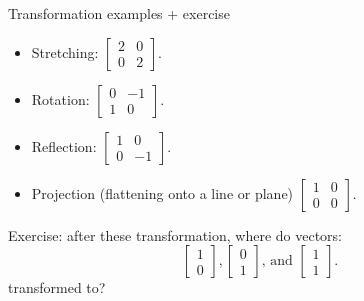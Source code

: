 \documentclass{beamer}
\begin{document}
\begin{frame}{Transformation examples + exercise}
  \begin{itemize}
    \item Stretching: 
    $\begin{bmatrix} 2 & 0 \\ 0 & 2 \end{bmatrix}.$ %
    \item Rotation:
    $\begin{bmatrix} 0 & -1 \\ 1 & 0 \end{bmatrix}.$
    \item Reflection:
    $\begin{bmatrix} 1 & 0 \\ 0 & -1 \end{bmatrix}.$
    \item Projection (flattening onto a line or plane) $\begin{bmatrix} 1 & 0 \\ 0 & 0 \end{bmatrix}.$
  \end{itemize}

  Exercise: after these transformation, where do vectors:
  \begin{equation}
      \begin{bmatrix} 1 \\ 0 \end{bmatrix}, \begin{bmatrix} 0 \\ 1 \end{bmatrix} \text{, and }\begin{bmatrix} 1 \\ 1 \end{bmatrix}. 
  \end{equation}
  transformed to?
\end{frame}
\end{document}

